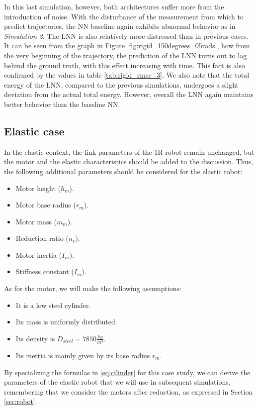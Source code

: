 \documentclass[a4paper]{article}
\begin{document}
In this last simulation, however, both architectures suffer more from the introduction of noise. With the disturbance of the measurement from which to predict trajectories, the NN baseline again exhibits abnormal behavior as in \textit{Simulation 2}. The LNN is also relatively more distressed than in previous cases. It can be seen from the graph in Figure \ref{fig:rigid_150degrees_05rads}, how from the very beginning of the trajectory, the prediction of the LNN turns out to lag behind the ground truth, with this effect increasing with time. This fact is also confirmed by the values in table \ref{tab:rigid_rmse_3}. We also note that the total energy of the LNN, compared to the previous simulations, undergoes a slight deviation from the actual total energy. However, overall the LNN again maintains better behavior than the baseline NN.



\subsection{Elastic case}
In the elastic context, the link parameters of the 1R robot remain unchanged, but the motor and the elastic characteristics should be added to the discussion. Thus, the following additional parameters should be considered for the elastic robot:

\begin{itemize}
    \item Motor height ($h_m$).
    \item Motor base radius ($r_m$).
    \item Motor mass ($m_m$).
    \item Reduction ratio ($n_r$).
    \item Motor inertia ($I_m$).
    \item Stiffness constant ($I_m$).
\end{itemize}

As for the motor, we will make the following assumptions:
\begin{itemize}
    \item It is a low steel cylinder.
    \item Its mass is uniformly distributed.
    \item Its density is $D_{steel}=7850 \frac{kg}{m^3}$.
    \item Its inertia is mainly given by its base radius $r_m$.
\end{itemize} 

By specializing the formulas in \eqref{eq:cilinder} for this case study, we can derive the parameters of the elastic robot that we will use in subsequent simulations, remembering that we consider the motors after reduction, as expressed in Section \ref{sec:robot}.
\end{document}
